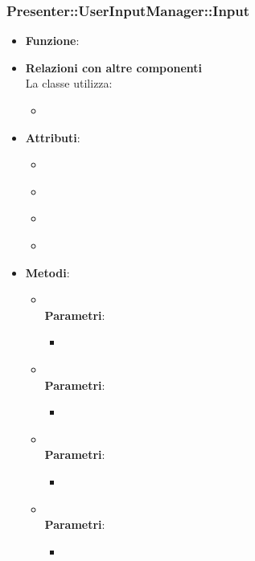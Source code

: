 \subsubsection{Presenter::UserInputManager::Input}
\begin{itemize}
\item\textbf{Funzione}:
\item\textbf{Relazioni con altre componenti}\\
La classe utilizza:
	\begin{itemize}
		\item
	\end{itemize}
\item\textbf{Attributi}:
	\begin{itemize}
		\item\code{}\\
		\item\code{}\\
		\item\code{}\\
		\item\code{}\\
	\end{itemize}
\item\textbf{Metodi}:
	\begin{itemize}
		\item\code{}\\
		\textbf{Parametri}:
			\begin{itemize}
				\item\code{}\\
			\end{itemize}
		\item\code{}\\
		\textbf{Parametri}:
			\begin{itemize}
				\item\code{}\\
			\end{itemize}
		\item\code{}\\
		\textbf{Parametri}:
			\begin{itemize}
				\item\code{}\\
			\end{itemize}
		\item\code{}\\
		\textbf{Parametri}:
			\begin{itemize}
				\item\code{}\\
			\end{itemize}
	\end{itemize}
\end{itemize}

